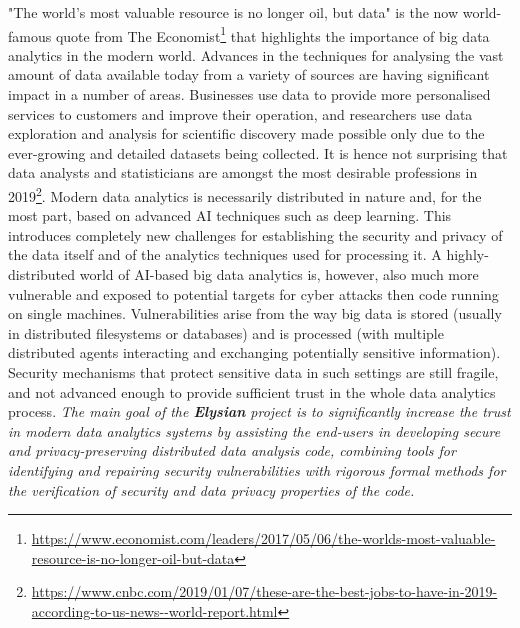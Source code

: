 \documentclass[a4paper,11pt]{article}
\newcommand{\project}[1]{\textbf{#1}\xspace}
\newcommand{\SECURITY}{\project{Elysian}}
\newcommand{\TheProject}{\SECURITY}
\begin{document}
"The world's most valuable resource is no longer oil, but data" is the now world-famous quote from The Economist\footnote{\url{https://www.economist.com/leaders/2017/05/06/the-worlds-most-valuable-resource-is-no-longer-oil-but-data}} that highlights the importance of big data analytics in the modern world. Advances in the techniques for analysing the vast amount of data available today from a variety of sources are having %
significant impact in a number of areas. Businesses use data to provide more personalised services to customers and improve their operation, and researchers use 
data exploration and analysis for scientific discovery made possible only due to %
the ever-growing and detailed datasets being collected. 
It is hence not surprising 
that data analysts and statisticians are amongst the most desirable professions in 2019\footnote{\url{https://www.cnbc.com/2019/01/07/these-are-the-best-jobs-to-have-in-2019-according-to-us-news--world-report.html}}. Modern data analytics is necessarily distributed in nature and, for the most part, based on advanced AI techniques such as deep learning.  This 
introduces
completely new challenges for establishing the security and privacy %
of the data itself and of the analytics techniques used for processing it. A highly-distributed world of AI-based big data analytics 
is, however, also much more vulnerable and exposed to
potential targets for cyber attacks then code running on single machines. Vulnerabilities arise %
from the way big data is stored (usually in distributed filesystems or databases) and is processed (with multiple distributed agents interacting and exchanging potentially sensitive information). Security mechanisms that protect sensitive data in such settings are still fragile, and not advanced enough to provide sufficient trust in the whole data analytics process. 
\emph{The main goal of the \TheProject{} project is to significantly increase the trust in modern data analytics systems by assisting the end-users in developing secure and privacy-preserving distributed data analysis code, combining tools for identifying and repairing security vulnerabilities with rigorous formal methods for the verification of security and data privacy properties of the code.}
\end{document}
